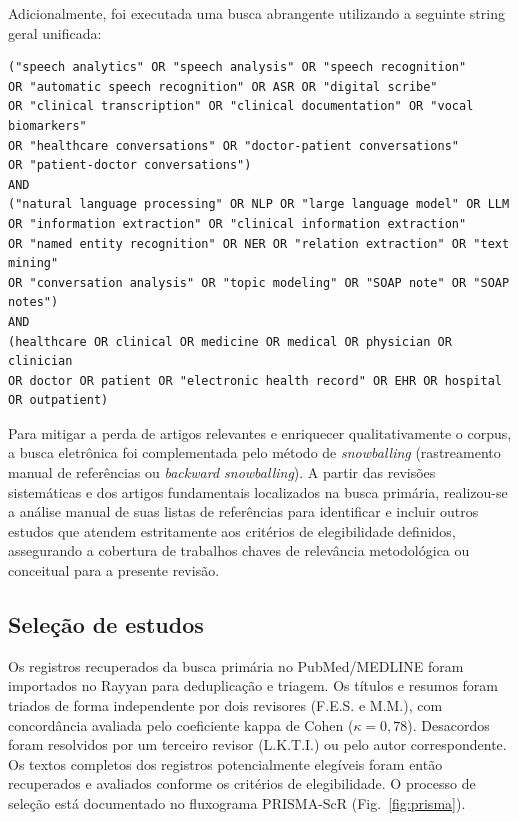 \documentclass[a4paper,fleqn]{cas-sc}
\begin{document}
Adicionalmente, foi executada uma busca abrangente utilizando a seguinte string geral unificada:

\begin{verbatim}
("speech analytics" OR "speech analysis" OR "speech recognition"
OR "automatic speech recognition" OR ASR OR "digital scribe"
OR "clinical transcription" OR "clinical documentation" OR "vocal biomarkers"
OR "healthcare conversations" OR "doctor-patient conversations"
OR "patient-doctor conversations")
AND
("natural language processing" OR NLP OR "large language model" OR LLM
OR "information extraction" OR "clinical information extraction"
OR "named entity recognition" OR NER OR "relation extraction" OR "text mining"
OR "conversation analysis" OR "topic modeling" OR "SOAP note" OR "SOAP notes")
AND
(healthcare OR clinical OR medicine OR medical OR physician OR clinician
OR doctor OR patient OR "electronic health record" OR EHR OR hospital
OR outpatient)
\end{verbatim}

Para mitigar a perda de artigos relevantes e enriquecer qualitativamente o corpus, a busca eletrônica foi complementada pelo método de \textit{snowballing} (rastreamento manual de referências ou \textit{backward snowballing}). A partir das revisões sistemáticas e dos artigos fundamentais localizados na busca primária, realizou-se a análise manual de suas listas de referências para identificar e incluir outros estudos que atendem estritamente aos critérios de elegibilidade definidos, assegurando a cobertura de trabalhos chaves de relevância metodológica ou conceitual para a presente revisão.

\subsection{Seleção de estudos}

Os registros recuperados da busca primária no PubMed/MEDLINE foram importados no Rayyan
\citep{Ouzzani2016} para deduplicação e triagem. Os títulos e resumos foram
triados de forma independente por dois revisores (F.E.S. e M.M.), com
concordância avaliada pelo coeficiente kappa de Cohen ($\kappa = 0{,}78$). Desacordos
foram resolvidos por um terceiro revisor (L.K.T.I.) ou pelo autor correspondente.
Os textos completos dos registros potencialmente elegíveis foram então
recuperados e avaliados conforme os critérios de elegibilidade. O processo de
seleção está documentado no fluxograma PRISMA-ScR (Fig.~\ref{fig:prisma}).
\end{document}
